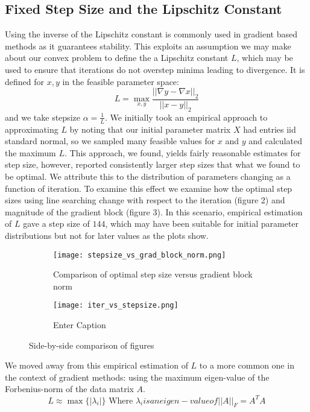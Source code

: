\documentclass{article}
\begin{document}
\subsection{Fixed Step Size and the Lipschitz Constant}
Using the inverse of the Lipschitz constant is commonly used in gradient based methods as it guarantees stability. This exploits an assumption we may make about our convex problem to define the a Lipschitz constant $L$, which may be used to ensure that iterations do not overstep minima leading to divergence. It is defined for $x,y$ in the feasible parameter space:
$$L = \max_{x,y} \frac{||\nabla y - \nabla x||_2}{||x - y||_2}$$
and we take stepsize $\alpha=\frac{1}{L}$.
We initially took an empirical approach to approximating $L$ by noting that our initial parameter matrix $X$ had entries iid standard normal, so we sampled many feasible values for $x$ and $y$ and calculated the maximum $L$. This approach, we found, yields fairly reasonable estimates for step size, however, reported consistently larger step sizes that what we found to be optimal. We attribute this to the distribution of parameters changing as a function of iteration. To examine this effect we examine how the optimal step sizes using line searching change with respect to the iteration (figure 2) and magnitude of the gradient block (figure 3). In this scenario, empirical estimation of $L$ gave a step size of $144$, which may have been suitable for initial parameter distributions but not for later values as the plots show.
\begin{figure}[H]
    \centering
    \begin{subfigure}[b]{0.45\linewidth}  %
        \centering
        \texttt{[image: stepsize\_vs\_grad\_block\_norm.png]}
        \caption{Comparison of optimal step size versus gradient block norm}
        \label{fig:stepsize_block}
    \end{subfigure}
    \hfill
    \begin{subfigure}[b]{0.45\linewidth}  %
        \centering
        \texttt{[image: iter\_vs\_stepsize.png]}
        \caption{Enter Caption}
        \label{fig:enter-label}
    \end{subfigure}
    \caption{Side-by-side comparison of figures}
    \label{fig:side_by_side}
\end{figure}
We moved away from this empirical estimation of $L$ to a more common one in the context of gradient methods: using the maximum eigen-value of the Forbenius-norm of the data matrix $A$.
$$L\approx\max\{|\lambda_i|\} \text{ Where } \lambda_i is an eigen-value of ||A||_F = A^TA$$
\end{document}
